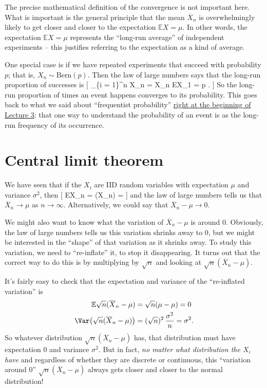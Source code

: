 \documentclass[
  letterpaper,
]{report}
\theoremstyle{definition}
\theoremstyle{definition}
\theoremstyle{remark}
\begin{document}
The precise mathematical definition of the convergence is not important
here. What is important is the general principle that the mean
\(\overline X_n\) is overwhelmingly likely to get closer and closer to
the expectation \(\mathbb EX = \mu\). In other words, the expectation
\(\mathbb EX = \mu\) represents the ``long-run average'' of independent
experiments -- this justifies referring to the expectation as a kind of
average.

One special case is if we have repeated experiments that succeed with
probability \(p\); that is, \(X_n \sim \text{Bern}(p)\). Then the law of
large numbers says that the long-run proportion of successes is {[}
 \sum\_\{i = 1\}\^{}n X\_n = \overline X\_n \to \mathbb EX\_1
= p . {]} So the long-run proportion of times an event happens converges
to its probability. This goes back to what we said about ``frequentist
probability'' \protect\hyperlink{what-is-prob}{right at the beginning of
Lecture 3}: that one way to understand the probability of an event is as
the long-run frequency of its occurrence.

\hypertarget{clt}{%
\section{Central limit theorem}\label{clt}}

We have seen that if the \(X_i\) are IID random variables with
expectation \(\mu\) and variance \(\sigma^2\), then {[}
\mathbb E\overline X\_n = \mu \qquad \Var \big(\overline X\_n\big) =
 {]} and the law of large numbers tells us that
\(\overline X_n \to \mu\) as \(n \to \infty\). Alternatively, we could
say that \(\overline X_n - \mu \to 0\).

We might also want to know what the variation of \(\overline X_n - \mu\)
is around 0. Obviously, the law of large numbers tells us this variation
shrinks away to 0, but we might be interested in the ``shape'' of that
variation as it shrinks away. To study this variation, we need to
``re-inflate'' it, to stop it disappearing. It turns out that the
correct way to do this is by multiplying by \(\sqrt{n}\) and looking at
\(\sqrt{n}(\overline X_n - \mu)\).

It's fairly easy to check that the expectation and variance of the
``re-inflated variation'' is \begin{align*}
\mathbb E\sqrt{n} (\overline X_n - \mu) &= \sqrt{n}(\mu - \mu) = 0 \\
\Var\big(\sqrt{n} (\overline X_n - \mu)\big) &= (\sqrt n)^2 \, \frac{\sigma^2}{n} = \sigma^2 . 
\end{align*} So whatever distribution \(\sqrt{n}(\overline X_n - \mu)\)
has, that distribution must have expectation \(0\) and variance
\(\sigma^2\). But in fact, \emph{no matter what distribution the \(X_i\)
have} and regardless of whether they are discrete or continuous, this
``variation around 0'' \(\sqrt{n}(\overline X_n - \mu)\) always gets
closer and closer to the normal distribution!
\end{document}
